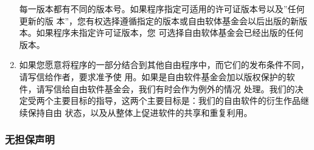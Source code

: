 \begin{enumerate}
        每一版本都有不同的版本号。如果程序指定可适用的许可证版本号以及''任何更新的版 本''，您有权选择遵循指定的版本或自由软体基金会以后出版的新版本。如果程序未指定许可证版本，您 可选择自由软体基金会已经出版的任何版本。
    \item 如果您愿意将程序的一部分结合到其他自由程序中，而它们的发布条件不同，请写信给作者，要求准予使 用。如果是自由软件基金会加以版权保护的软件，请写信给自由软件基金会，我们有时会作为例外的情况 处理。我们的决定受两个主要目标的指导，这两个主要目标是：我们的自由软件的衍生作品继续保持自由 状态，以及从整体上促进软件的共享和重复利用。
\end{enumerate}


\subsubsection{无担保声明}

